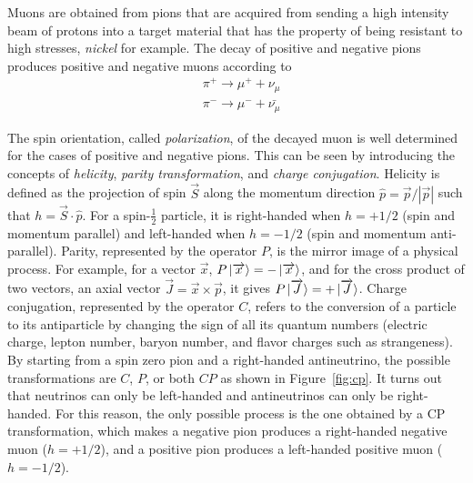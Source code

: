 \documentclass{outhesis}
\begin{document}
Muons are obtained from pions that are acquired from sending a high intensity beam of protons into a target material that has the property of being resistant to high stresses, \emph{nickel} for example. The decay of positive and negative pions produces positive and negative muons according to 
\begin{equation}
\begin{split}
&\pi^+ \rightarrow \mu^+ + \nu_{\mu}\\
&\pi^- \rightarrow \mu^- + \bar{\nu_{\mu}}
\end{split}
\end{equation}

The spin orientation, called \emph{polarization},  of the decayed muon is well determined for the cases of positive and negative pions. This can be seen by introducing the concepts of \emph{helicity}, \emph{parity transformation}, and \emph{charge conjugation}. Helicity is defined as the projection of spin $\overrightarrow{S}$ along the momentum direction $\hat{p} = \overrightarrow{p}/|\overrightarrow{p}|$ such that $h = \overrightarrow{S}\cdot \hat{p}$. For a spin-$\frac{1}{2}$ particle, it is right-handed when $h=+1/2$ (spin and momentum parallel) and left-handed when $h=-1/2$ (spin and momentum anti-parallel). Parity, represented by the operator $P$, is the mirror image of a physical process. For example, for a vector $\overrightarrow{x}$, $P\ket{\overrightarrow{x}} = -\ket{\overrightarrow{x}}$, and for the cross product of two vectors, an axial vector $\overrightarrow{J} = \overrightarrow{x} \times \overrightarrow{p}$, it gives $P\ket{\overrightarrow{J}} = +\ket{\overrightarrow{J}} $. Charge conjugation, represented by the operator $C$, refers to the conversion of a particle to its antiparticle by changing the sign of all its quantum numbers (electric charge, lepton number, baryon number, and flavor charges such as strangeness). \\ 
By starting from a spin zero pion and a right-handed antineutrino, the possible transformations are $C$, $P$, or both $CP$ as shown in Figure~\ref{fig:cp}. It turns out that neutrinos can only be left-handed and antineutrinos can only be right-handed. For this reason, the only possible process is the one obtained by a CP transformation, which makes a negative pion produces a right-handed negative muon ($h=+1/2$), and a positive pion produces a left-handed positive muon ($h=-1/2$). 
\end{document}
